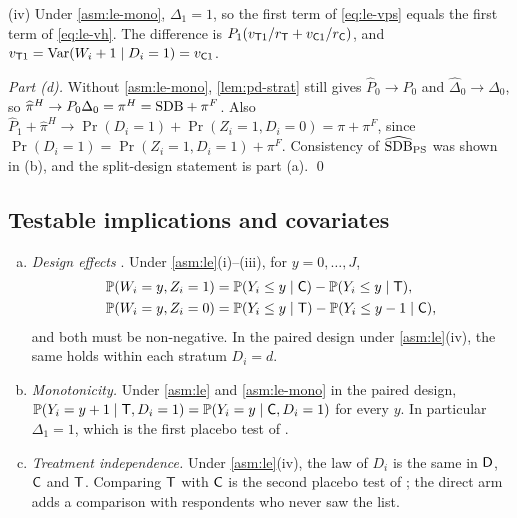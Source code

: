 (iv) Under \cref{asm:le-mono}, $\Delta_1=1$, so the first term of \eqref{eq:le-vps} equals the first term of \eqref{eq:le-vh}. The difference is $P_1(v_{\mathsf{T}1}/r_{\mathsf{T}}+v_{\mathsf{C}1}/r_{\mathsf{C}})$, and $v_{\mathsf{T}1}=\operatorname{Var}(W_i+1\mid D_i=1)=v_{\mathsf{C}1}$.

\emph{Part (d).} Without \cref{asm:le-mono}, \cref{lem:pd-strat} still gives $\widehat P_0\to P_0$ and $\widehat\Delta_0\to\Delta_0$, so $\widehat\pi^H\to P_0\Delta_0=\pi^H=\mathrm{SDB}+\pi^F$. Also $\widehat P_1+\widehat\pi^H\to\Pr(D_i=1)+\Pr(Z_i=1,D_i=0)=\pi+\pi^F$, since $\Pr(D_i=1)=\Pr(Z_i=1,D_i=1)+\pi^F$. Consistency of $\widehat{\mathrm{SDB}}_{\mathrm{PS}}$ was shown in (b), and the split-design statement is part (a). \qed

\subsection{Testable implications and covariates}\label{app:pd-tests}

\begin{corollary}\label{cor:le-tests}
\begin{enumerate}[(a)]
  \item \emph{Design effects} \citep{blair2012}. Under \cref{asm:le}(i)--(iii), for $y=0,\dots,J$,
  \begin{equation}\label{eq:le-types}
  \begin{aligned}
    \mathbb{P}(W_i=y,Z_i=1)&=\mathbb{P}(Y_i\le y\mid\mathsf{C})-\mathbb{P}(Y_i\le y\mid\mathsf{T}),\\
    \mathbb{P}(W_i=y,Z_i=0)&=\mathbb{P}(Y_i\le y\mid\mathsf{T})-\mathbb{P}(Y_i\le y-1\mid\mathsf{C}),
  \end{aligned}
  \end{equation}
  and both must be non-negative. In the paired design under \cref{asm:le}(iv), the same holds within each stratum $D_i=d$.
  \item \emph{Monotonicity.} Under \cref{asm:le} and \cref{asm:le-mono} in the paired design, $\mathbb{P}(Y_i=y+1\mid\mathsf{T},D_i=1)=\mathbb{P}(Y_i=y\mid\mathsf{C},D_i=1)$ for every $y$. In particular $\Delta_1=1$, which is the first placebo test of \citet{aronow2015}.
  \item \emph{Treatment independence.} Under \cref{asm:le}(iv), the law of $D_i$ is the same in $\mathsf{D}$, $\mathsf{C}$ and $\mathsf{T}$. Comparing $\mathsf{T}$ with $\mathsf{C}$ is the second placebo test of \citet{aronow2015}; the direct arm adds a comparison with respondents who never saw the list.
\end{enumerate}
\end{corollary}

